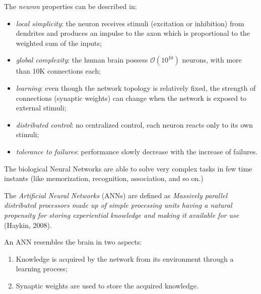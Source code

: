 The \textit{neuron} properties can be described in:
\begin{itemize}
	\item \textit{local simplicity}: the neuron receives stimuli (excitation or inhibition) from dendrites and produces an impulse to the axon which is proportional to the weighted sum of the inputs;
	\item \textit{global complexity}: the human brain possess 
	$\mathcal{O}(10^{10})$ 
	neurons, with more than 10K connections each;
	\item \textit{learning}: even though the network topology is relatively fixed, the strength of connections (synaptic weights) can change when the network is exposed to external stimuli;
	\item \textit{distributed control}: no centralized control, each neuron reacts only to its own stimuli;
	\item \textit{tolerance to failures}: performance slowly decrease with the increase of failures.
\end{itemize}

The biological Neural Networks are able to solve very complex tasks in few time instants (like memorization, recognition, association, and so on.)


The \textit{Artificial Neural Networks} (ANNs) are defined as \textit{Massively parallel distributed processors made up of simple processing units having a natural propensity for storing experiential knowledge and making it available for use} (Haykin, 2008).

An ANN resembles the brain in two aspects:
\begin{enumerate}
	\item Knowledge is acquired by the network from its environment through a learning process;
	\item Synaptic weights are used to store the acquired knowledge.
\end{enumerate}

